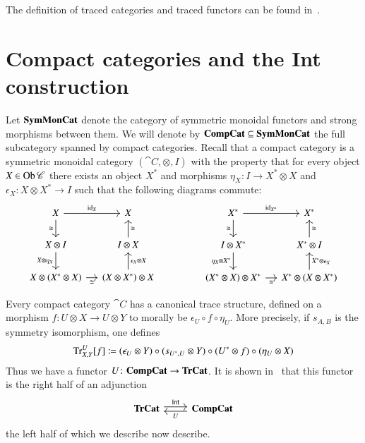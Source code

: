 \documentclass[12pt,oneside,article,draft]{memoir}
\begin{document}
The definition of traced categories and traced functors can be found in~\cite{JoyalStreetVerity}.


\section{Compact categories and the Int construction}\label{sec:compact and int}

Let $\mathbf{SymMonCat}$ denote the category of symmetric monoidal functors and strong morphisms between them.
We will denote by $\mathbf{CompCat}\subseteq\mathbf{SymMonCat}$ the full subcategory spanned by compact categories.
Recall that a compact category is a symmetric monoidal category $(\cat{C},\otimes,I)$ with the property that for every object $X\in\operatorname{Ob}\mathscr{C}$ there exists an object $X^*$ and morphisms $\eta_X\colon I\to X^*\otimes X$ and $\epsilon_X\colon X\otimes X^*\to I$ such that the following diagrams commute:
$$
	\begin{tikzcd}[column sep=small]
		X\arrow[r,"\id_X"]\arrow[d,"\cong"'] & X \\
		X\otimes I\arrow[d,"X\otimes\eta_X"'] & I\otimes X\arrow[u,"\cong"'] \\
		X\otimes(X^*\otimes X)\arrow[r,"\cong"'] & (X\otimes X^*)\otimes X\arrow[u,"\epsilon_X\otimes X"']
	\end{tikzcd}
	\hspace{.6in}
	\begin{tikzcd}[column sep=small]
		X^*\arrow[r,"\id_{X^*}"]\arrow[d,"\cong"'] & X^*\\
		I\otimes X^*\arrow[d,"\eta_X\otimes X^*"'] & X^*\otimes I\arrow[u,"\cong"'] \\
		(X^*\otimes X)\otimes X^*\arrow[r,"\cong"'] & X^*\otimes (X\otimes X^*)\arrow[u,"X^*\otimes\epsilon_X"']
	\end{tikzcd}
$$

Every compact category $\cat{C}$ has a canonical trace structure, defined on a morphism $f\colon U\otimes X\to U\otimes Y$ to morally be $\epsilon_U\circ f\circ \eta_U$.
More precisely, if $s_{A,B}$ is the symmetry isomorphism, one defines
	$$\operatorname{Tr}^U_{X,Y}[f]\coloneqq(\epsilon_U\otimes Y)\circ (s_{U^*,U}\otimes Y)\circ (U^*\otimes f)\circ (\eta_U\otimes X)$$
Thus we have a functor $U\colon\mathbf{CompCat}\to\mathbf{TrCat}$.
It is shown in~\cite{JoyalStreetVerity} that this functor is the right half of an adjunction
\begin{equation}\label{dia:traced compact adjunction}
\begin{tikzcd}
	\TrCat\arrow[r,shift left=.5ex, "\Int"]&\CompCat\arrow[l,shift left=.5ex,"U"]
\end{tikzcd}
\end{equation}
the left half of which we describe now describe. 
\end{document}
